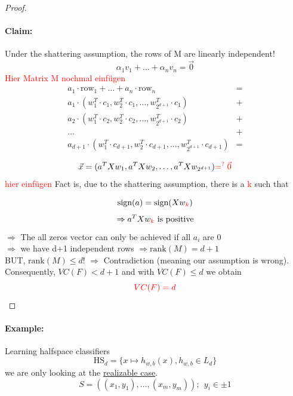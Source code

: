 \documentclass[10pt,a4paper]{article}
\theoremstyle{remark}
\theoremstyle{definition}
\theoremstyle{plain}
\begin{document}
\begin{proof}
 \paragraph{Claim:} Under the shattering assumption, the rows of M are linearly independent!
 $$ \alpha_1 v_1 + \hdots + \alpha_n v_n = \vec{0}$$
 \newline
 \textcolor{red}{ Hier Matrix M nochmal einfügen}
 \newline
\begin{align*}
a_1 \cdot \text{row}_1 + \hdots + a_n \cdot \text{row}_n &=\\
a_1 \cdot ( w_1^T \cdot c_1, w_2^T\cdot c_1, \hdots, w_{2^{d+1}}^T\cdot c_1 ) &+\\
a_2 \cdot ( w_1^T\cdot c_2, w_2^T\cdot c_2, \hdots, w_{2^{d+1}}^T\cdot c_2 ) &+\\
\hdots &+\\
a_{d+1} \cdot ( w_1^T \cdot c_{d+1}, w_2^T\cdot c_{d+1}, \hdots, w_{2^{d+1}}^T\cdot c_{d+1} ) &=
\end{align*}

\begin{align*}
	\vec{x} = (a^T X w_1, a^T X w_2, \hdots, a^T X w_{2^{d+1}}) \textcolor{red}{=^? \vec{0}}
\end{align*}
\textcolor{red}{hier einfügen}
\newline
Fact is, due to the shattering assumption, there is a \textcolor{red}{k} such that

$$
	\text{sign}(a) = \text{sign}(Xw_{\textcolor{red}{k}})
$$
$$
\Rightarrow a^T X w_{\textcolor{red}{k}} \text{ is positive}
$$
$\Rightarrow$ The all zeros vector can only be achieved if all $a_i$ are 0\\
$\Rightarrow$ we have d+1 independent rows $\Rightarrow \text{rank}(M) = d+1$\\
BUT, $\text{rank}(M) \leq d$! $\Rightarrow$ Contradiction (meaning our assumption is wrong). Consequently, $VC(F) < d+1$ and with $VC(F) \leq d$ we obtain $$\textcolor{red}{VC(F) = d}$$
\end{proof}


\paragraph{Example:} Learning halfspace classifiers\\
$$\text{HS}_d = \{ x \mapsto h_{w,b}(x), h_{w,b} \in L_d \}$$
we are only looking at the \underline{realizable case}.
$$S = ((x_1, y_1), ..., (x_m, y_m));\  \ y_i \in {\pm 1}$$
\end{document}
